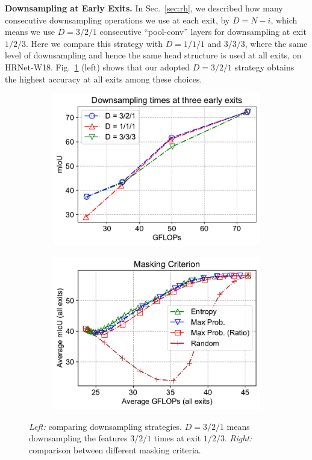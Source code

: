 \documentclass{article} %
\begin{document}
\vspace{1ex}
\noindent\textbf{Downsampling at Early Exits.}
In Sec.~\ref{sec:rh}, we described how many consecutive downsampling operations we use at each exit, by $D = N -i$, which means we use $D=3/2/1$ consecutive ``pool-conv'' layers for downsampling at exit $1/2/3$.
Here we compare this strategy with $D=1/1/1$ and $3/3/3$, where the same level of downsampling and hence the same head structure is used at all exits, on HRNet-W18. 
Fig.~\ref{fig:twofigs} (left) shows that our adopted $D=3/2/1$ strategy obtains the highest accuracy at all exits among these choices.


\begin{figure}[htbp]
\centering
   \begin{subfigure}{0.45\linewidth} \centering
     \includegraphics[scale=0.47]{head_short.pdf}
   \end{subfigure}
   \begin{subfigure}{0.45\linewidth} \centering
     \includegraphics[scale=0.47]{crit.pdf}
   \end{subfigure}
\vspace{-2ex}
\caption{\emph{Left:} comparing downsampling strategies. $D=3/2/1$ means downsampling the features $3/2/1$ times at exit $1/2/3$. \emph{Right:} comparison between different masking criteria.} 
\label{fig:twofigs}
\vspace{-2ex}
\end{figure}
\end{document}
